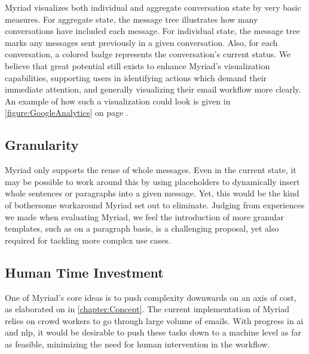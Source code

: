Myriad visualizes both individual and aggregate conversation state by very basic measures. For aggregate state, the message tree illustrates how many conversations have included each message. For individual state, the message tree marks any messages sent previously in a given conversation. Also, for each conversation, a colored badge represents the conversation's current status. We believe that great potential still exists to enhance Myriad's visualization capabilities, supporting users in identifying actions which demand their immediate attention, and generally visualizing their email workflow more clearly. An example of how such a visualization could look is given in \autoref{figure:GoogleAnalytics} on page \pageref{figure:GoogleAnalytics}.


\subsection{Granularity}

Myriad only supports the reuse of whole messages. Even in the current state, it may be possible to work around this by using placeholders to dynamically insert whole sentences or paragraphs into a given message. Yet, this would be the kind of bothersome workaround Myriad set out to eliminate. Judging from experiences we made when evaluating Myriad, we feel the introduction of more granular templates, such as on a paragraph basis, is a challenging proposal, yet also required for tackling more complex use cases.

\subsection{Human Time Investment}

One of Myriad’s core ideas is to push complexity downwards on an axis of cost, as elaborated on in \autoref{chapter:Concept}. The current implementation of Myriad relies on crowd workers to go through large volume of emails. With progress in \gls{ai} and \gls{nlp}, it would be desirable to push these tasks down to a machine level as far as feasible, minimizing the need for human intervention in the workflow.


